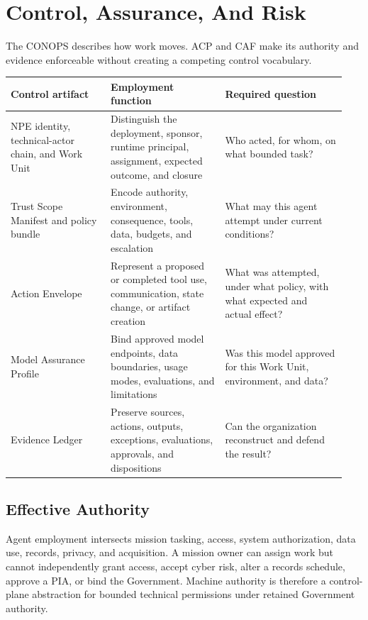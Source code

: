 \documentclass[11pt]{article}
\begin{document}
\hypertarget{6-control-assurance-and-risk}{%
\section{Control, Assurance, And
Risk}\label{6-control-assurance-and-risk}}

The CONOPS describes how work moves. ACP and CAF make its authority and
evidence enforceable without creating a competing control vocabulary.

\begingroup\footnotesize\setlength{\tabcolsep}{3pt}\begin{longtable}{p{0.28\linewidth}p{0.32\linewidth}p{0.34\linewidth}}
\toprule\noalign{}
Control artifact & Employment function & Required question \\
\midrule\noalign{}
\endhead
\bottomrule\noalign{}
\endlastfoot
NPE identity, technical-actor chain, and Work Unit & Distinguish the
deployment, sponsor, runtime principal, assignment, expected outcome,
and closure & Who acted, for whom, on what bounded task? \\
Trust Scope Manifest and policy bundle & Encode authority, environment,
consequence, tools, data, budgets, and escalation & What may this agent
attempt under current conditions? \\
Action Envelope & Represent a proposed or completed tool use,
communication, state change, or artifact creation & What was attempted,
under what policy, with what expected and actual effect? \\
Model Assurance Profile & Bind approved model endpoints, data
boundaries, usage modes, evaluations, and limitations & Was this model
approved for this Work Unit, environment, and data? \\
Evidence Ledger & Preserve sources, actions, outputs, exceptions,
evaluations, approvals, and dispositions & Can the organization
reconstruct and defend the result? \\
\end{longtable}\endgroup

\hypertarget{61-effective-authority}{%
\subsection{Effective Authority}\label{61-effective-authority}}

Agent employment intersects mission tasking, access, system
authorization, data use, records, privacy, and acquisition. A mission
owner can assign work but cannot independently grant access, accept
cyber risk, alter a records schedule, approve a PIA, or bind the
Government. Machine authority is therefore a control-plane abstraction
for bounded technical permissions under retained Government authority.
\end{document}
